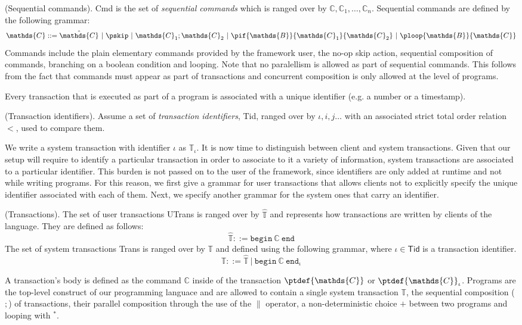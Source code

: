 \begin{defn}
	(Sequential commands).
	\textsf{Cmd} is the set of \emph{sequential commands} which is ranged over by $\mathds{C}, \mathds{C}_1, \ldots, \mathds{C}_n$. Sequential commands are defined by the following grammar:
	\[
		\mathds{C} ::=
			\hat{\mathds{C}}\
			|\ \pskip\
			|\ \mathds{C}_1; \mathds{C}_2\
			|\ \pif{\mathds{B}}{\mathds{C}_1}{\mathds{C}_2}\
			|\ \ploop{\mathds{B}}{\mathds{C}}
	\]
	Commands include the plain elementary commands provided by the framework user, the no-op skip action, sequential composition of commands, branching on a boolean condition and looping. Note that no paralellism is allowed as part of sequential commands. This follows from the fact that commands must appear as part of transactions and concurrent composition is only allowed at the level of programs.
\end{defn}

Every transaction that is executed as part of a program is associated with a unique identifier (e.g. a number or a timestamp).
\begin{param}
	(Transaction identifiers).
	 Assume a set of \emph{transaction identifiers}, \textsf{Tid}, ranged over by $\iota, i, j \ldots$ with an associated strict total order relation $<$, used to compare them.
\end{param}
We write a system transaction with identifier $\iota$ as $\mathds{T}_\iota$. It is now time to distinguish between client and system transactions. Given that our setup will require to identify a particular transaction in order to associate to it a variety of information, system transactions are associated to a particular identifier. This burden is not passed on to the user of the framework, since identifiers are only added at runtime and not while writing programs. For this reason, we first give a grammar for user transactions that allows clients not to explicitly specify the unique identifier associated with each of them. Next, we specify another grammar for the system ones that carry an identifier.

\begin{defn}
	(Transactions).
	The set of user transactions \textsf{UTrans} is ranged over by $\hat{\mathds{T}}$ and represents how transactions are written by clients of the language. They are defined as follows:
	\[
		\hat{\mathds{T}} ::=
			\mathtt{begin}\ \mathds{C}\ \mathtt{end}
	\]
	The set of system transactions \textsf{Trans} is ranged over by $\mathds{T}$ and defined using the following grammar, where $\iota \in \mathsf{Tid}$ is a transaction identifier.
	\[
		\mathds{T} ::=
			\hat{\mathds{T}}\
			|\ \mathtt{begin}\ \mathds{C}\ \mathtt{end}_\iota
	\]
\end{defn}
A transaction's body is defined as the command $\mathds{C}$ inside of the transaction $\ptdef{\mathds{C}}$ or $\ptdef{\mathds{C}}_\iota$. Programs are the top-level construct of our programming languace and are allowed to contain a single system transaction $\mathds{T}$, the sequential composition ($;$) of transactions, their parallel composition through the use of the $\|$ operator, a non-deterministic choice $+$ between two programs and looping with $^*$.


